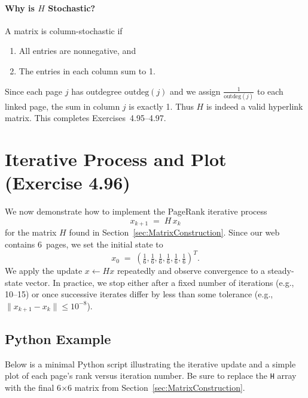 \documentclass{article}
\begin{document}
\paragraph{Why is $H$ Stochastic?}
A matrix is column-stochastic if
\begin{enumerate}
  \item All entries are nonnegative, and 
  \item The entries in each column sum to 1.
\end{enumerate}
Since each page $j$ has outdegree $\text{outdeg}(j)$ and we assign $\tfrac{1}{\text{outdeg}(j)}$ to each linked page, the sum 
in column $j$ is exactly 1. Thus $H$ is indeed a valid hyperlink matrix. This completes Exercises~4.95--4.97.


\section{Iterative Process and Plot (Exercise 4.96)}

We now demonstrate how to implement the PageRank iterative process 
\[
x_{k+1} \;=\; H \, x_{k}
\]
for the matrix \(H\) found in Section~\ref{sec:MatrixConstruction}. 
Since our web contains 6~pages, we set the initial state to
\[
x_0 \;=\; \left(\tfrac{1}{6}, \tfrac{1}{6}, \tfrac{1}{6}, \tfrac{1}{6}, 
\tfrac{1}{6}, \tfrac{1}{6}\right)^T.
\]
We apply the update \(x \leftarrow Hx\) repeatedly and observe convergence 
to a steady-state vector. In practice, we stop either after a fixed number of 
iterations (e.g., 10--15) or once successive iterates differ by less than 
some tolerance (e.g., \(\|x_{k+1} - x_k\|\le 10^{-8}\)).

\subsection{Python Example}
Below is a minimal Python script illustrating the iterative update and a simple 
plot of each page's rank versus iteration number. 
Be sure to replace the \verb|H| array with the final 6$\times$6 matrix 
from Section~\ref{sec:MatrixConstruction}.
\end{document}
